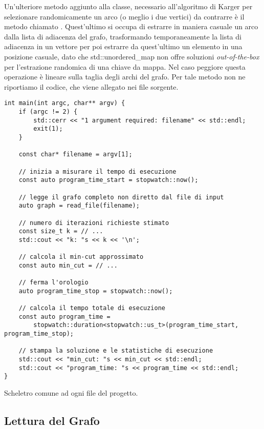 Un'ulteriore metodo aggiunto alla classe, necessario all'algoritmo di Karger per selezionare randomicamente un arco (o meglio i due vertici) da contrarre è il metodo chiamato . Quest'ultimo si occupa di estrarre in maniera casuale un arco dalla lista di adiacenza del grafo, trasformando temporaneamente la lista di adiacenza in un vettore per poi estrarre da quest'ultimo un elemento in una posizione casuale, dato che std::unordered\_map non offre soluzioni \textit{out-of-the-box} per l'estrazione randomica di una chiave da mappa. Nel caso peggiore questa operazione è lineare sulla taglia degli archi del grafo. Per tale metodo non ne riportiamo il codice, che viene allegato nei file sorgente.

\begin{listing}[!ht]
\begin{verbatim}
int main(int argc, char** argv) {
    if (argc != 2) {
        std::cerr << "1 argument required: filename" << std::endl;
        exit(1);
    }

    const char* filename = argv[1];

    // inizia a misurare il tempo di esecuzione
    const auto program_time_start = stopwatch::now();

    // legge il grafo completo non diretto dal file di input
    auto graph = read_file(filename);

    // numero di iterazioni richieste stimato
    const size_t k = // ...
    std::cout << "k: "s << k << '\n';

    // calcola il min-cut approssimato
    const auto min_cut = // ...
    
    // ferma l'orologio
    auto program_time_stop = stopwatch::now();

    // calcola il tempo totale di esecuzione
    const auto program_time =
        stopwatch::duration<stopwatch::us_t>(program_time_start, program_time_stop);

    // stampa la soluzione e le statistiche di esecuzione
    std::cout << "min_cut: "s << min_cut << std::endl;
    std::cout << "program_time: "s << program_time << std::endl;
}
\end{verbatim}
\caption{Scheletro comune ad ogni file  del progetto.}
\label{listing:main-cpp}
\end{listing}

\subsection{Lettura del Grafo}

